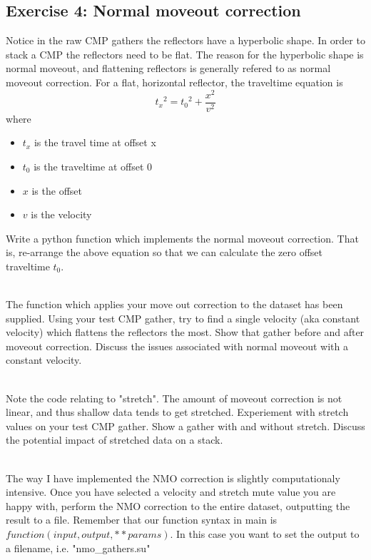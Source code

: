 \documentclass[a4paper, 10pt]{article}
\begin{document}
\subsection*{Exercise 4: Normal moveout correction}
Notice in the raw CMP gathers the reflectors have a hyperbolic shape.  In order to stack a CMP the reflectors need to be flat.  The reason for the hyperbolic shape is normal moveout, and flattening reflectors is generally refered to as normal moveout correction.  For a flat, horizontal reflector, the traveltime equation is
\[ {t_x}^2 = {t_0}^2 + \frac{x^2}{v^2}\]
where
\begin{itemize}
\item $t_x$ is the travel time at offset x
\item $t_0$ is the traveltime at offset 0
\item $x$ is the offset
\item $v$ is the velocity
\end{itemize}
Write a python function which implements the normal moveout correction. That is, re-arrange the above equation so that we can calculate the zero offset traveltime $t_0$.
\par~\\
The function which applies your move out correction to the dataset has been supplied. Using your test CMP gather, try to find a single velocity (aka constant velocity) which flattens the reflectors the most. Show that gather before and after moveout correction.  Discuss the issues associated with normal moveout with a constant velocity.
\par~\\
Note the code relating to "stretch".  The amount of moveout correction is not linear, and thus shallow data tends to get stretched. Experiement with stretch values on your test CMP gather. Show a gather with and without stretch.  Discuss the potential impact of stretched data on a stack.
\par~\\
The way I have implemented the NMO correction is slightly computationaly intensive.  Once you have selected a velocity and stretch mute value you are happy with, perform the NMO correction to the entire dataset, outputting the result to a file.  Remember that our function syntax in main is $function(input, output, **params)$. In this case you want to set the output to a filename, i.e. "nmo_gathers.su"
\end{document}
